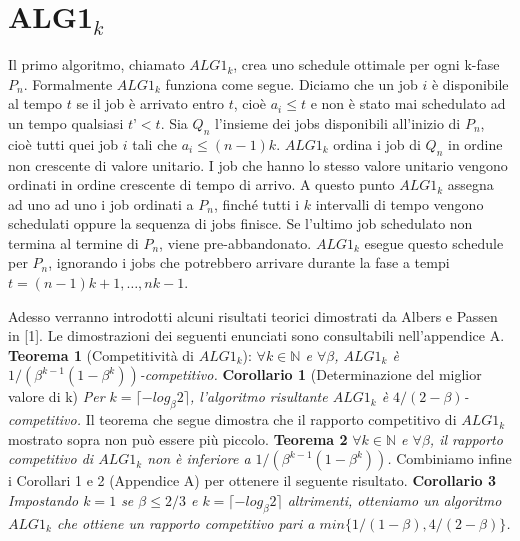 \documentclass[twoside,openany,titlepage,fleqn,
	headinclude,12pt,a4paper,BCOR5mm,footinclude]{scrbook}
\newcommand*{\N}{\mathbb{N}}
\begin{document}
\section{ALG1$_{k}$}
Il primo algoritmo, chiamato $ALG1_{k}$, crea uno schedule ottimale per ogni k-fase $P_{n}$. Formalmente $ALG1_{k}$ funziona come segue. Diciamo che un job $i$ è disponibile al tempo $t$ se il job è arrivato entro $t$, cioè $a_{i} \leq t$ e non è stato mai schedulato ad un tempo qualsiasi $t’ < t$. Sia $Q_{n}$ l’insieme dei jobs disponibili all’inizio di $P_{n}$, cioè tutti quei job $i$ tali che $a_{i} \leq (n-1)k$. $ALG1_{k}$ ordina i job di $Q_{n}$ in ordine non crescente di valore unitario. I job che hanno lo stesso valore unitario vengono ordinati in ordine crescente di tempo di arrivo. A questo punto $ALG1_{k}$ assegna ad uno ad uno i job ordinati a $P_{n}$, finché tutti i $k$ intervalli di tempo vengono schedulati oppure la sequenza di jobs finisce. Se l’ultimo job schedulato non termina al termine di $P_{n}$, viene pre-abbandonato. $ALG1_{k}$ esegue questo schedule per $P_{n}$, ignorando i jobs che potrebbero arrivare durante la fase a tempi $t = (n-1)k + 1,…, nk - 1$. 

Adesso verranno introdotti alcuni risultati teorici dimostrati da Albers e Passen in [1]. Le dimostrazioni dei seguenti enunciati sono consultabili nell'appendice A.
\newline\newline
\textbf{Teorema 1} (Competitività di $ALG1_{k}$): \textit{ $\forall k \in \N$ e $\forall \beta$, $ALG1_{k}$ è $1/(\beta^{k-1}(1 - \beta^{k}))$-competitivo.}
\newline \newline
\textbf{Corollario 1} (Determinazione del miglior valore di k)
\textit{Per $k = \lceil-log_{\beta} 2\rceil$, l'algoritmo risultante $ALG1_{k}$ è $4 / (2 - \beta )$-competitivo.} \newline\newline
Il teorema che segue dimostra che il rapporto competitivo di $ALG1_{k}$ mostrato sopra non può essere più piccolo.\newline\newline
\textbf{Teorema 2}
\textit{$\forall k \in \N$ e $\forall \beta$, il rapporto competitivo di $ALG1_{k}$ non è inferiore a $1 / (\beta^{k - 1} (1 - \beta^{k}))$.}\newline\newline
Combiniamo infine i Corollari 1 e 2 (Appendice A) per ottenere il seguente risultato.\newline\newline
\textbf{Corollario 3}
\textit{Impostando $k = 1$ se $\beta  \leq 2/3$ e $k = \lceil- log_{\beta}2\rceil$ altrimenti, otteniamo un algoritmo $ALG1_{k}$ che ottiene un rapporto competitivo pari a $min\{1 / (1 - \beta ), 4 / (2 - \beta )\}$.}
\end{document}
